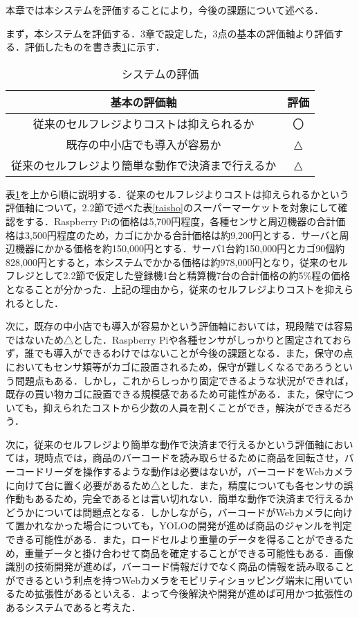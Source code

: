 
本章では本システムを評価することにより，今後の課題について述べる．

まず，本システムを評価する．3章で設定した，3点の基本の評価軸より評価する．評価したものを書き表\ref{hyouka}に示す．

\begin{table}[htb]
\begin{center}
\caption{システムの評価}
\begin{tabular}{|c|c|} \hline
基本の評価軸 & 評価 \\ \hline \hline
従来のセルフレジよりコストは抑えられるか & 〇 \\
既存の中小店でも導入が容易か & △ \\
従来のセルフレジより簡単な動作で決済まで行えるか & △\\ \hline
\end{tabular}
\label{hyouka}
\end{center}
\end{table}

表\ref{hyouka}を上から順に説明する．従来のセルフレジよりコストは抑えられるかという評価軸について，2.2節で述べた表\ref{taisho}のスーパーマーケットを対象にして確認をする．Raspberry Piの価格は5,700円程度，各種センサと周辺機器の合計価格は3,500円程度のため，カゴにかかる合計価格は約9,200円とする．サーバと周辺機器にかかる価格を約150,000円とする．サーバ1台約150,000円とカゴ90個約828,000円とすると，本システムでかかる価格は約978,000円となり，従来のセルフレジとして2.2節で仮定した登録機1台と精算機7台の合計価格の約5\%程の価格となることが分かった．上記の理由から，従来のセルフレジよりコストを抑えられるとした．

次に，既存の中小店でも導入が容易かという評価軸においては，現段階では容易ではないため△とした．Raspberry Piや各種センサがしっかりと固定されておらず，誰でも導入ができるわけではないことが今後の課題となる．また，保守の点においてもセンサ類等がカゴに設置されるため，保守が難しくなるであろうという問題点もある．しかし，これからしっかり固定できるような状況ができれば，既存の買い物カゴに設置できる規模感であるため可能性がある．また，保守についても，抑えられたコストから少数の人員を割くことができ，解決ができるだろう．

次に，従来のセルフレジより簡単な動作で決済まで行えるかという評価軸においては，現時点では，商品のバーコードを読み取らせるために商品を回転させ，バーコードリーダを操作するような動作は必要はないが，バーコードをWebカメラに向けて台に置く必要があるため△とした．また，精度についても各センサの誤作動もあるため，完全であるとは言い切れない．簡単な動作で決済まで行えるかどうかについては問題点となる．しかしながら，バーコードがWebカメラに向けて置かれなかった場合についても，YOLOの開発が進めば商品のジャンルを判定できる可能性がある．また，ロードセルより重量のデータを得ることができるため，重量データと掛け合わせて商品を確定することができる可能性もある．画像識別の技術開発が進めば，バーコード情報だけでなく商品の情報を読み取ることができるという利点を持つWebカメラをモビリティショッピング端末に用いているため拡張性があるといえる．よって今後解決や開発が進めば可用かつ拡張性のあるシステムであると考えた．

